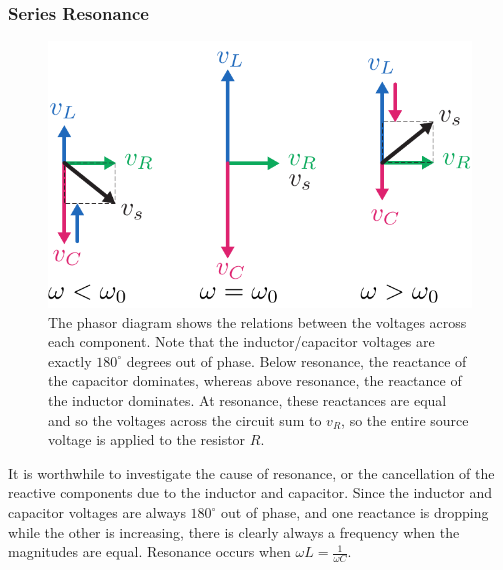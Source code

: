 \subsubsection{Series Resonance}
\begin{figure}
\centering
\includegraphics[scale=.8]{rlcphasor}
\caption{The phasor diagram shows the relations between the voltages across each component.  Note that the inductor/capacitor voltages are exactly $180^\circ$ degrees out of phase.  Below resonance, the reactance of the capacitor dominates, whereas above resonance, the reactance of the inductor dominates.  At resonance, these reactances are equal and so the voltages across the circuit sum to $v_R$, so the entire source voltage is applied to the resistor $R$. }
\label{fig:rlcphasor}
\end{figure}
It is worthwhile to investigate the cause of resonance, or the cancellation of the reactive components due to the inductor and capacitor.  Since the inductor and capacitor voltages are always $180^\circ$ out of phase, and one reactance is dropping while the other is increasing, there is clearly always a frequency when the magnitudes are equal.  Resonance occurs when $\omega L = \frac{1}{\omega C}$.  
